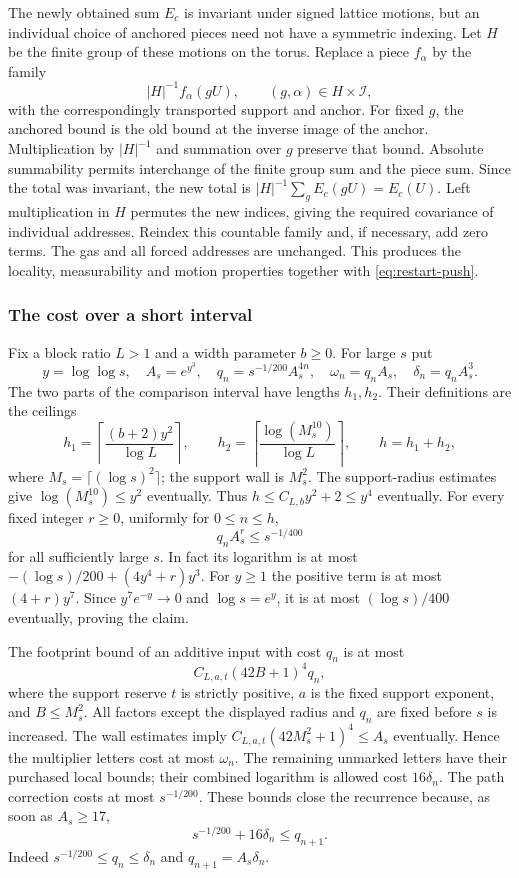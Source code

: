 The newly obtained sum $E_c$ is invariant under signed lattice motions,
but an individual choice of anchored pieces need not have a symmetric
indexing. Let $H$ be the finite group of these motions on the torus.
Replace a piece $f_\alpha$ by the family
\[
 |H|^{-1}f_\alpha(gU),\qquad (g,\alpha)\in H\times\mathcal I,
\]
with the correspondingly transported support and anchor. For fixed $g$,
the anchored bound is the old bound at the inverse image of the anchor.
Multiplication by $|H|^{-1}$ and summation over $g$ preserve that bound.
Absolute summability permits interchange of the finite group sum and
the piece sum. Since the total was invariant, the new total is
$|H|^{-1}\sum_gE_c(gU)=E_c(U)$. Left multiplication in $H$ permutes the
new indices, giving the required covariance of individual addresses.
Reindex this countable family and, if necessary, add zero terms.
The gas and all forced addresses are unchanged. This produces the
locality, measurability and motion properties together with
\eqref{eq:restart-push}.

\subsubsection{The cost over a short interval}

Fix a block ratio $L>1$ and a width parameter $b\ge0$. For large $s$ put
\[
 y=\log\log s,\quad A_s=e^{y^3},\quad
 q_n=s^{-1/200}A_s^{4n},\quad
 \omega_n=q_nA_s,\quad \delta_n=q_nA_s^3.
\]
The two parts of the comparison interval have lengths $h_1,h_2$.
Their definitions are the ceilings
\[
 h_1=\left\lceil\frac{(b+2)y^2}{\log L}\right\rceil,
 \qquad
 h_2=\left\lceil\frac{\log(M_s^{10})}{\log L}\right\rceil,
 \qquad h=h_1+h_2,
\]
where $M_s=\lceil(\log s)^2\rceil$; the support wall is $M_s^2$.
The support-radius estimates give $\log(M_s^{10})\le y^2$ eventually.
Thus $h\le C_{L,b}y^2+2\le y^4$ eventually.
For every fixed integer $r\ge0$, uniformly for $0\le n\le h$,
\begin{equation}\label{eq:restart-decay}
 q_nA_s^r\le s^{-1/400}
\end{equation}
for all sufficiently large $s$. In fact its logarithm is at most
$-(\log s)/200+(4y^4+r)y^3$. For $y\ge1$ the positive term is at most
$(4+r)y^7$. Since $y^7e^{-y}\to0$ and $\log s=e^y$, it is at most
$(\log s)/400$ eventually, proving the claim.

The footprint bound of an additive input with cost $q_n$ is at most
\[
 C_{L,a,t}(42B+1)^4q_n,
\]
where the support reserve $t$ is strictly positive, $a$ is the fixed
support exponent, and $B\le M_s^2$. All factors except the displayed
radius and $q_n$ are fixed before $s$ is increased. The wall estimates
imply $C_{L,a,t}(42M_s^2+1)^4\le A_s$ eventually. Hence the multiplier
letters cost at most $\omega_n$. The remaining unmarked letters have
their purchased local bounds; their combined logarithm is allowed cost
$16\delta_n$. The path correction costs at most $s^{-1/200}$. These
bounds close the recurrence because, as soon as $A_s\ge17$,
\begin{equation}\label{eq:restart-recurrence}
 s^{-1/200}+16\delta_n\le q_{n+1}.
\end{equation}
Indeed $s^{-1/200}\le q_n\le\delta_n$ and
$q_{n+1}=A_s\delta_n$.

